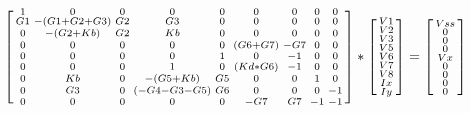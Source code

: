 \(
\begin{bsmallmatrix}
1 & 0 & 0 & 0 & 0 & 0 & 0 & 0 & 0\\
G1 & -(G1 + G2 + G3) & G2 & G3 & 0 & 0 & 0 & 0 & 0\\
0 & -(G2+Kb) & G2 & Kb & 0 & 0 & 0 & 0 & 0\\
0 & 0 & 0 & 0 & 0 & (G6 + G7) & -G7 & 0 & 0\\
0 & 0 & 0 & 0 & 1 & 0 & -1 & 0 & 0\\
0 & 0 & 0 & 1 & 0 & (Kd * G6) & -1 & 0 & 0\\
0 & Kb & 0 & -(G5 + Kb) & G5 & 0 & 0 & 1 & 0\\
0 & G3 & 0 & (-G4-G3-G5) & G6 & 0 & 0 & 0 & -1\\
0 & 0 & 0 & 0 & 0 & -G7 & G7 & -1 & -1
\end{bsmallmatrix}
*
\begin{bsmallmatrix}
V1\\V2\\V3\\V5\\V6\\V7\\V8\\Ix\\Iy
\end{bsmallmatrix}
=
\begin{bsmallmatrix}
Vss\\0\\0\\0\\Vx\\0\\0\\0\\0
\end{bsmallmatrix}
\)

\vspace{20pt}

